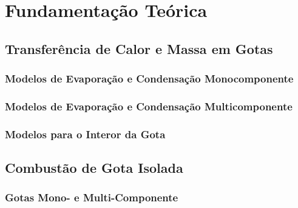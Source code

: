\section{Fundamentação Teórica}




\subsection{Transferência de Calor e Massa em Gotas}

\subsubsection{Modelos de Evaporação e Condensação Monocomponente}


% 

\subsubsection{Modelos de Evaporação e Condensação Multicomponente}

\subsubsection{Modelos para o Interor da Gota}




\subsection{Combustão de Gota Isolada}

\subsubsection{Gotas Mono- e Multi-Componente}


